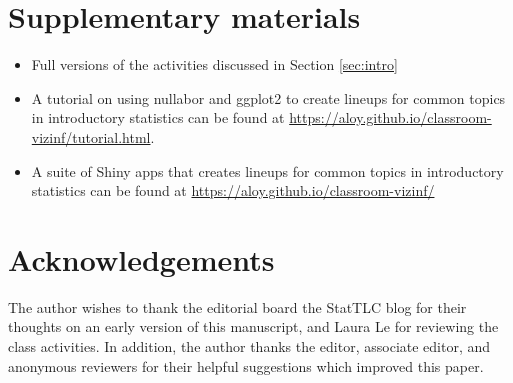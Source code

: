 \documentclass[12pt]{article}
\begin{document}
\section*{Supplementary materials}

\begin{itemize}
\item
  Full versions of the activities discussed in Section \ref{sec:intro}
\item
  A tutorial on using nullabor and ggplot2 to create lineups for common
  topics in introductory statistics can be found at
  \url{https://aloy.github.io/classroom-vizinf/tutorial.html}.
\item
  A suite of Shiny apps that creates lineups for common topics in
  introductory statistics can be found at
  \url{https://aloy.github.io/classroom-vizinf/}
\end{itemize}

\section*{Acknowledgements}

The author wishes to thank the editorial board the StatTLC blog for
their thoughts on an early version of this manuscript, and Laura Le for
reviewing the class activities. In addition, the author thanks the
editor, associate editor, and anonymous reviewers for their helpful
suggestions which improved this paper.



\end{document}
